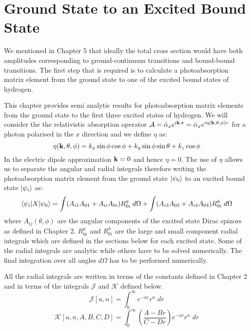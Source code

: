 
\section{Ground State to an Excited Bound State}
We mentioned in Chapter 5 that ideally the total cross section would have both
amplitudes corresponding to ground-continuum transitions and bound-bound
transitions. The first step that is required is to calculate a photoabsorption
matrix element from the ground state to one of the excited bound
states of hydrogen. 

This chapter provides semi analytic results for photoabsorption matrix elements
from the ground state to the first three excited states of hydrogen.
We will consider the the relativistic absorption operator $\mathcal{A} = \bar{\alpha}_x e^{i \mathbf{k} \cdot \mathbf{r} }
= \bar{\alpha}_x e^{i\eta(\mathbf{k},\theta,\phi)r}$ for a photon polarised in the $x$
direction and we define $\eta$ as:
\begin{equation}
    \eta(\mathbf{k},\theta,\phi) = k_x \sin\phi \cos\phi +
                               k_y \sin\phi \sin\theta +
                               k_z \cos\phi
\end{equation}
In the electric dipole approximation $\mathbf{k} = 0$ and hence $\eta = 0$. 
The use of $\eta$ allows us to separate the angular and radial integrals
therefore writing the photoabsorption matrix element from the ground
state $|\psi_0 \rangle$ to an excited bound state $|\psi_i \rangle$ as:
\begin{equation}
    \langle \psi_i| X |\psi_0 \rangle
    =
    \int (A_{i1}A_{01} + A_{ii}A_{0i}) R^g_{0i} \; d\Omega
    +
    \int (A_{i3}A_{03} + A_{i4}A_{04}) R^h_{0i} \; d\Omega
\end{equation}
where $A_{ij}(\theta,\phi)$ are the angular components of the excited 
state Dirac spinors as defined in Chapter 2.
$R^g_{0i}$ and $R^h_{0i}$ are the large and small component radial 
integrals which are defined in the sections below for each excited state.
Some of the radial integrals are analytic while others have to be solved
numerically. The final integration over all angles $ d\Omega $ has to 
be performed numerically.

All the radial integrals are written in terms of the constants defined in
Chapter 2 and in terms of the integrals $\mathcal{J}$ and $\mathcal{K}$ 
defined below.
\begin{equation}
    \mathcal{J}[a,n] = \int_0^\infty e^{-ar} r^n \; dr
\end{equation}
\begin{equation}
    \mathcal{K}[a,n,A,B,C,D] = \int_0^\infty 
                \left( \frac{A-Br}{C-Dr} \right) e^{-ar} r^{n} \; dr
\end{equation}

